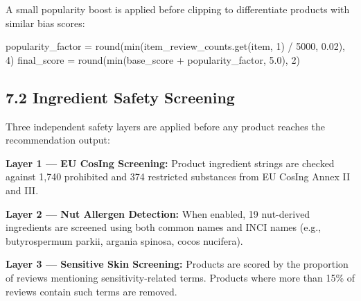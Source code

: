 \documentclass[
  letterpaper,
  DIV=11,
  numbers=noendperiod]{scrartcl}
\newenvironment{Shaded}{\begin{snugshade}}{\end{snugshade}}
\newcommand{\BuiltInTok}[1]{\textcolor[rgb]{0.00,0.23,0.31}{#1}}
\newcommand{\DecValTok}[1]{\textcolor[rgb]{0.68,0.00,0.00}{#1}}
\newcommand{\FloatTok}[1]{\textcolor[rgb]{0.68,0.00,0.00}{#1}}
\newcommand{\NormalTok}[1]{\textcolor[rgb]{0.00,0.23,0.31}{#1}}
\newcommand{\OperatorTok}[1]{\textcolor[rgb]{0.37,0.37,0.37}{#1}}
\begin{document}
A small popularity boost is applied before clipping to differentiate
products with similar bias scores:

\protect{}\label{code-popularity}
\begin{Shaded}
\begin{Highlighting}[]
\NormalTok{popularity\_factor }\OperatorTok{=} \BuiltInTok{round}\NormalTok{(}\BuiltInTok{min}\NormalTok{(item\_review\_counts.get(item, }\DecValTok{1}\NormalTok{) }\OperatorTok{/} \DecValTok{5000}\NormalTok{, }\FloatTok{0.02}\NormalTok{), }\DecValTok{4}\NormalTok{)}
\NormalTok{final\_score }\OperatorTok{=} \BuiltInTok{round}\NormalTok{(}\BuiltInTok{min}\NormalTok{(base\_score }\OperatorTok{+}\NormalTok{ popularity\_factor, }\FloatTok{5.0}\NormalTok{), }\DecValTok{2}\NormalTok{)}
\end{Highlighting}
\end{Shaded}

\subsection{7.2 Ingredient Safety
Screening}\label{ingredient-safety-screening}

Three independent safety layers are applied before any product reaches
the recommendation output:

\textbf{Layer 1 --- EU CosIng Screening:} Product ingredient strings are
checked against 1,740 prohibited and 374 restricted substances from EU
CosIng Annex II and III.

\textbf{Layer 2 --- Nut Allergen Detection:} When enabled, 19
nut-derived ingredients are screened using both common names and INCI
names (e.g., butyrospermum parkii, argania spinosa, cocos nucifera).

\textbf{Layer 3 --- Sensitive Skin Screening:} Products are scored by
the proportion of reviews mentioning sensitivity-related terms. Products
where more than 15\% of reviews contain such terms are removed.
\end{document}
